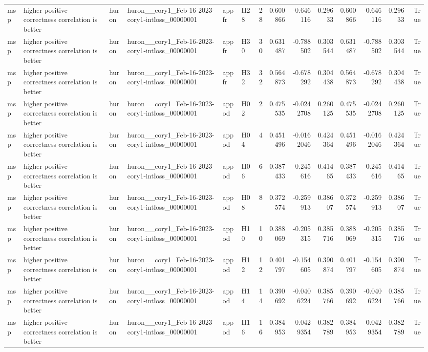 \begin{longtable}{llllllrrrrrrrr}
msp & higher positive correctness correlation is better & huron & huron\_\_cory1\_Feb-16-2023-cory1-intloss\_00000001 & appfr & H28 & 28 & 0.600866 & -0.646116 & 0.29633 & 0.600866 & -0.646116 & 0.29633 & True \\
msp & higher positive correctness correlation is better & huron & huron\_\_cory1\_Feb-16-2023-cory1-intloss\_00000001 & appfr & H30 & 30 & 0.631487 & -0.788502 & 0.303544 & 0.631487 & -0.788502 & 0.303544 & True \\
msp & higher positive correctness correlation is better & huron & huron\_\_cory1\_Feb-16-2023-cory1-intloss\_00000001 & appfr & H32 & 32 & 0.564873 & -0.678292 & 0.304438 & 0.564873 & -0.678292 & 0.304438 & True \\
msp & higher positive correctness correlation is better & huron & huron\_\_cory1\_Feb-16-2023-cory1-intloss\_00000001 & appod & H02 & 2 & 0.475535 & -0.0242708 & 0.260125 & 0.475535 & -0.0242708 & 0.260125 & True \\
msp & higher positive correctness correlation is better & huron & huron\_\_cory1\_Feb-16-2023-cory1-intloss\_00000001 & appod & H04 & 4 & 0.451496 & -0.0162046 & 0.424364 & 0.451496 & -0.0162046 & 0.424364 & True \\
msp & higher positive correctness correlation is better & huron & huron\_\_cory1\_Feb-16-2023-cory1-intloss\_00000001 & appod & H06 & 6 & 0.387433 & -0.245616 & 0.41465 & 0.387433 & -0.245616 & 0.41465 & True \\
msp & higher positive correctness correlation is better & huron & huron\_\_cory1\_Feb-16-2023-cory1-intloss\_00000001 & appod & H08 & 8 & 0.372574 & -0.259913 & 0.38607 & 0.372574 & -0.259913 & 0.38607 & True \\
msp & higher positive correctness correlation is better & huron & huron\_\_cory1\_Feb-16-2023-cory1-intloss\_00000001 & appod & H10 & 10 & 0.388069 & -0.205315 & 0.385716 & 0.388069 & -0.205315 & 0.385716 & True \\
msp & higher positive correctness correlation is better & huron & huron\_\_cory1\_Feb-16-2023-cory1-intloss\_00000001 & appod & H12 & 12 & 0.401797 & -0.154605 & 0.390874 & 0.401797 & -0.154605 & 0.390874 & True \\
msp & higher positive correctness correlation is better & huron & huron\_\_cory1\_Feb-16-2023-cory1-intloss\_00000001 & appod & H14 & 14 & 0.390692 & -0.0406224 & 0.385766 & 0.390692 & -0.0406224 & 0.385766 & True \\
msp & higher positive correctness correlation is better & huron & huron\_\_cory1\_Feb-16-2023-cory1-intloss\_00000001 & appod & H16 & 16 & 0.384953 & -0.0429354 & 0.382789 & 0.384953 & -0.0429354 & 0.382789 & True \\

\end{longtable}
